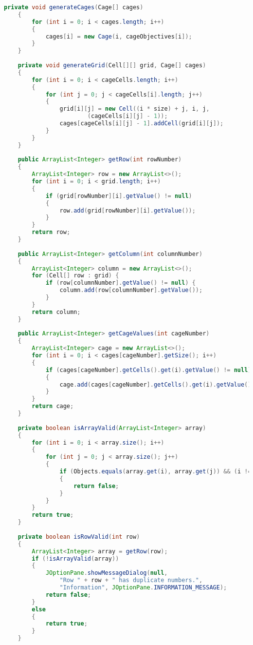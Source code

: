 \begin{lstlisting}[language=Java,basicstyle=\tiny,caption=Grid.java]
    private void generateCages(Cage[] cages)
    {
        for (int i = 0; i < cages.length; i++)
        {
            cages[i] = new Cage(i, cageObjectives[i]);
        }
    }
    
    private void generateGrid(Cell[][] grid, Cage[] cages)
    {
        for (int i = 0; i < cageCells.length; i++)
        {
            for (int j = 0; j < cageCells[i].length; j++)
            {
                grid[i][j] = new Cell((i * size) + j, i, j, 
                        (cageCells[i][j] - 1));
                cages[cageCells[i][j] - 1].addCell(grid[i][j]);
            }
        }
    }
    
    public ArrayList<Integer> getRow(int rowNumber)
    {
        ArrayList<Integer> row = new ArrayList<>();
        for (int i = 0; i < grid.length; i++)
        {
            if (grid[rowNumber][i].getValue() != null)
            {
                row.add(grid[rowNumber][i].getValue());
            }
        }
        return row;
    }
    
    public ArrayList<Integer> getColumn(int columnNumber)
    {
        ArrayList<Integer> column = new ArrayList<>();
        for (Cell[] row : grid) {
            if (row[columnNumber].getValue() != null) {
                column.add(row[columnNumber].getValue());
            }
        }
        return column;
    }
    
    public ArrayList<Integer> getCageValues(int cageNumber)
    {
        ArrayList<Integer> cage = new ArrayList<>();
        for (int i = 0; i < cages[cageNumber].getSize(); i++)
        {
            if (cages[cageNumber].getCells().get(i).getValue() != null)
            {
                cage.add(cages[cageNumber].getCells().get(i).getValue());
            }
        }
        return cage;
    }
    
    private boolean isArrayValid(ArrayList<Integer> array)
    {
        for (int i = 0; i < array.size(); i++)
        {
            for (int j = 0; j < array.size(); j++)
            {
                if (Objects.equals(array.get(i), array.get(j)) && (i != j))
                {
                    return false;
                }
            }
        }
        return true;
    }
    
    private boolean isRowValid(int row)
    {
        ArrayList<Integer> array = getRow(row);
        if (!isArrayValid(array))
        {
            JOptionPane.showMessageDialog(null, 
                "Row " + row + " has duplicate numbers.",
                "Information", JOptionPane.INFORMATION_MESSAGE);
            return false;
        }
        else
        {
            return true;
        }
    }
    

\end{lstlisting}
